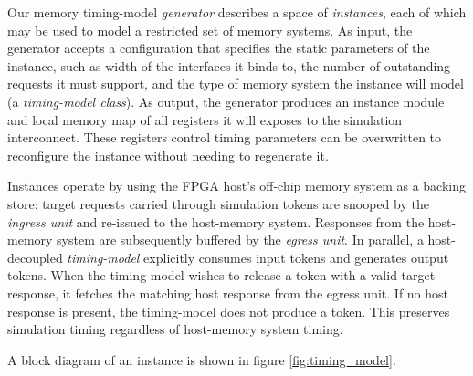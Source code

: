 
Our memory timing-model \textit{generator} describes a space of
\textit{instances}, each of which may be used to model a restricted set of
memory systems. As input, the generator accepts a configuration that specifies
the static parameters of the instance,  such as width of the interfaces it
binds to, the number of outstanding requests it must support, and the type of
memory system the instance will model (a \emph{timing-model class}). As output,
the generator produces an instance module and local memory map of all registers
it will exposes to the simulation interconnect. These registers control timing
parameters can be overwritten to reconfigure the instance without needing to
regenerate it.

Instances operate by using the FPGA host's off-chip memory system as a backing
store: target requests carried through simulation tokens are snooped by the
\emph{ingress unit} and re-issued to the host-memory system. Responses from the
host-memory system are subsequently buffered by the \emph{egress unit}. In
parallel, a host-decoupled \emph{timing-model} explicitly consumes input tokens
and generates output tokens. When the timing-model wishes to release a token
with a valid target response, it fetches the matching host response from the
egress unit. If no host response is present, the timing-model does not produce
a token. This preserves simulation timing regardless of host-memory system
timing.

A block diagram of an instance is shown in figure \ref{fig:timing_model}.

